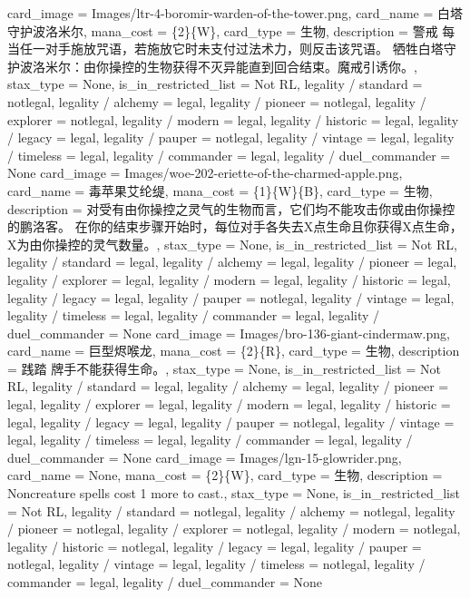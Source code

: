 \documentclass[lang = cn, color = black, 10pt]{AllThatStax}
\begin{document}
\card
{
	card_image = Images/ltr-4-boromir-warden-of-the-tower.png,
	card_name = 白塔守护波洛米尔,
	mana_cost = \{2\}\{W\},
	card_type = 生物,
	description = 警戒
	每当任一对手施放咒语，若施放它时未支付过法术力，则反击该咒语。
	牺牲白塔守护波洛米尔：由你操控的生物获得不灭异能直到回合结束。魔戒引诱你。,
	stax_type = None,
	is_in_restricted_list = Not RL,
	legality / standard = notlegal,
	legality / alchemy = legal,
	legality / pioneer = notlegal,
	legality / explorer = notlegal,
	legality / modern = legal,
	legality / historic = legal,
	legality / legacy = legal,
	legality / pauper = notlegal,
	legality / vintage = legal,
	legality / timeless = legal,
	legality / commander = legal,
	legality / duel_commander = None
}
\card
{
	card_image = Images/woe-202-eriette-of-the-charmed-apple.png,
	card_name = 毒苹果艾纶缇,
	mana_cost = \{1\}\{W\}\{B\},
	card_type = 生物,
	description = 对受有由你操控之灵气的生物而言，它们均不能攻击你或由你操控的鹏洛客。
	在你的结束步骤开始时，每位对手各失去X点生命且你获得X点生命，X为由你操控的灵气数量。,
	stax_type = None,
	is_in_restricted_list = Not RL,
	legality / standard = legal,
	legality / alchemy = legal,
	legality / pioneer = legal,
	legality / explorer = legal,
	legality / modern = legal,
	legality / historic = legal,
	legality / legacy = legal,
	legality / pauper = notlegal,
	legality / vintage = legal,
	legality / timeless = legal,
	legality / commander = legal,
	legality / duel_commander = None
}
\card
{
	card_image = Images/bro-136-giant-cindermaw.png,
	card_name = 巨型烬喉龙,
	mana_cost = \{2\}\{R\},
	card_type = 生物,
	description = 践踏
	牌手不能获得生命。,
	stax_type = None,
	is_in_restricted_list = Not RL,
	legality / standard = legal,
	legality / alchemy = legal,
	legality / pioneer = legal,
	legality / explorer = legal,
	legality / modern = legal,
	legality / historic = legal,
	legality / legacy = legal,
	legality / pauper = notlegal,
	legality / vintage = legal,
	legality / timeless = legal,
	legality / commander = legal,
	legality / duel_commander = None
}
\card
{
	card_image = Images/lgn-15-glowrider.png,
	card_name = None,
	mana_cost = \{2\}\{W\},
	card_type = 生物,
	description = Noncreature spells cost {1} more to cast.,
	stax_type = None,
	is_in_restricted_list = Not RL,
	legality / standard = notlegal,
	legality / alchemy = notlegal,
	legality / pioneer = notlegal,
	legality / explorer = notlegal,
	legality / modern = notlegal,
	legality / historic = notlegal,
	legality / legacy = legal,
	legality / pauper = notlegal,
	legality / vintage = legal,
	legality / timeless = notlegal,
	legality / commander = legal,
	legality / duel_commander = None
}
\end{document}
